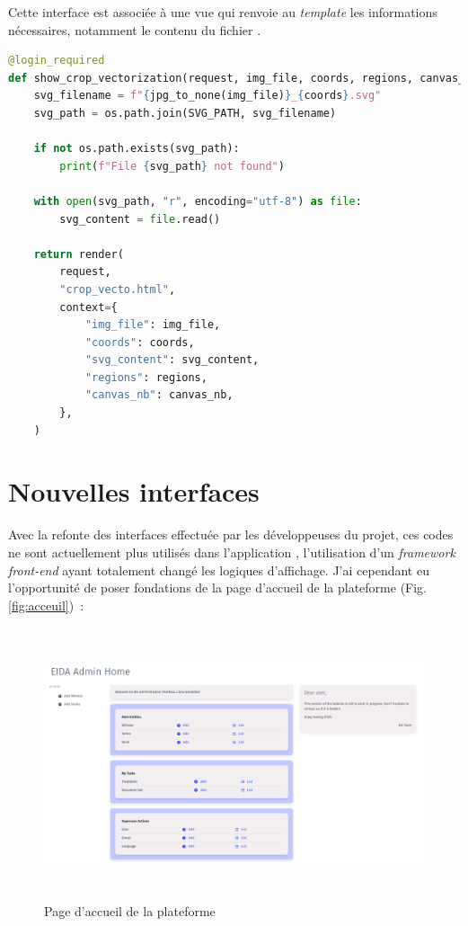 Cette interface est associée à une vue qui renvoie au \textit{template} les informations nécessaires, notamment le contenu du fichier \svg. 

\begin{lstlisting}[language=python, frame=single, breaklines=true, caption={Vue pour relier les données à leur affichage dans l'interface de manipulation.}]
@login_required
def show_crop_vectorization(request, img_file, coords, regions, canvas_nb):
    svg_filename = f"{jpg_to_none(img_file)}_{coords}.svg"
    svg_path = os.path.join(SVG_PATH, svg_filename)

    if not os.path.exists(svg_path):
        print(f"File {svg_path} not found")

    with open(svg_path, "r", encoding="utf-8") as file:
        svg_content = file.read()

    return render(
        request,
        "crop_vecto.html",
        context={
            "img_file": img_file,
            "coords": coords,
            "svg_content": svg_content,
            "regions": regions,
            "canvas_nb": canvas_nb,
        },
    )
\end{lstlisting}

\section{Nouvelles interfaces}

Avec la refonte des interfaces effectuée par les développeuses du projet, ces codes ne sont actuellement plus utilisés dans l'application \aikon, l'utilisation d'un \textit{framework front-end} ayant totalement changé les logiques d'affichage. J'ai cependant eu l'opportunité de poser fondations de la page d'accueil de la plateforme (Fig. \ref{fig:acceuil})~: 

	\begin{figure}[H]
	\begin{center}
		\includegraphics[height=8cm]{figues/accueil.png}
	\end{center}
	\caption{Page d'accueil de la plateforme \aikon}
	\label{fig:accueil} \end{figure}